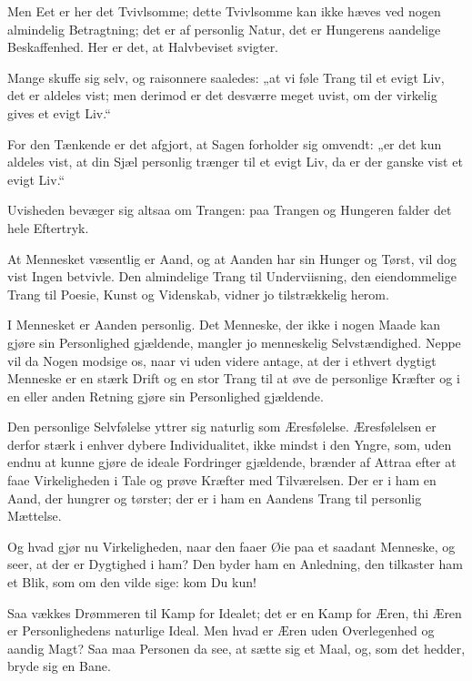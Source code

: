 \documentclass[12pt,a4paper]{book}
\newcommand{\apage}[1]{\marginnote{\footnotesize\textit{[#1]}}}
\begin{document}
Men Eet er her det Tvivlsomme; dette Tvivlsomme kan ikke hæves ved nogen
almindelig Betragtning; det er af personlig Natur, det er Hungerens
aandelige Beskaffenhed. Her er det, at Halvbeviset svigter.

Mange skuffe sig selv, og raisonnere saaledes: „at vi føle Trang til et
evigt Liv, det er aldeles vist; men derimod er det desværre meget uvist,
om der virkelig gives et evigt Liv.“

For den Tænkende er det afgjort, at Sagen forholder sig omvendt: „er det
kun aldeles vist, at din Sjæl personlig trænger til et evigt Liv, da er
der ganske vist et evigt Liv.“

Uvisheden bevæger sig altsaa om Trangen: paa Trangen og Hungeren falder
det hele Eftertryk.

At Mennesket væsentlig er Aand, og at Aanden har sin Hunger og Tørst, vil
dog vist Ingen betvivle. Den almindelige Trang til Underviisning, den
eiendommelige Trang til Poesie, Kunst og Videnskab, vidner jo
tilstrækkelig herom.

I Mennesket er Aanden personlig. Det Menneske, der ikke i nogen Maade kan
gjøre sin Personlighed gjældende, mangler jo menneskelig Selvstændighed.
Neppe vil da Nogen modsige os, naar vi uden videre antage, at der i
ethvert dygtigt Menneske er en stærk Drift og en \apage{28} stor Trang til at
øve de personlige Kræfter og i en eller anden Retning gjøre sin
Personlighed gjældende.

Den personlige Selvfølelse yttrer sig naturlig som Æresfølelse.
Æresfølelsen er derfor stærk i enhver dybere Individualitet, ikke mindst i
den Yngre, som, uden endnu at kunne gjøre de ideale Fordringer gjældende,
brænder af Attraa efter at faae Virkeligheden i Tale og prøve Kræfter med
Tilværelsen. Der er i ham en Aand, der hungrer og tørster; der er i ham en
Aandens Trang til personlig Mættelse.

Og hvad gjør nu Virkeligheden, naar den faaer Øie paa et saadant
Menneske, og seer, at der er Dygtighed i ham? Den byder ham en Anledning,
den tilkaster ham et Blik, som om den vilde sige: kom Du kun!

Saa vækkes Drømmeren til Kamp for Idealet; det er en Kamp for Æren, thi
Æren er Personlighedens naturlige Ideal. Men hvad er Æren uden
Overlegenhed og aandig Magt? Saa maa Personen da see, at sætte sig et
Maal, og, som det hedder, bryde sig en Bane.
\end{document}

